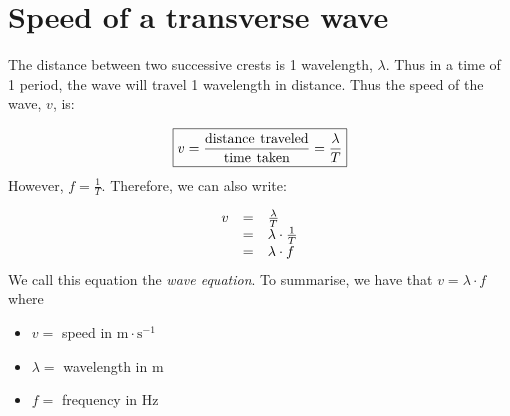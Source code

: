     \noindent
      \label{m38806*uid21}
            \section{Speed of a transverse wave}
            \nopagebreak
   
        \label{m38806*id319706}The distance between two successive crests is 1 wavelength, $\lambda $. Thus in a time of 1 period, the wave will travel 1 wavelength in distance. Thus the speed of the wave, $v$, is:\par 
        \label{m38806*id319732}\nopagebreak\noindent{}
    \begin{equation}\nonumber
    \boxed{v=\frac{\text{distance}\phantom{\rule{4.pt}{0ex}}\text{traveled}}{\text{time}\phantom{\rule{4.pt}{0ex}}\text{taken}}=\frac{\lambda }{T}}
      \end{equation}
        \label{m38806*id319776}However, $f=\frac{1}{T}$. Therefore, we can also write:\par 
        \label{m38806*id319802}\nopagebreak\noindent{}
          
    \begin{equation}\nonumber
    \begin{array}{ccc}\hfill v& =& \frac{\lambda }{T}\hfill \\ & =& \lambda \ensuremath{\cdot}\frac{1}{T}\hfill \\ & =& \lambda \ensuremath{\cdot}f\hfill \end{array}
      \end{equation}
        \label{m38806*id319870}We call this equation the \textsl{wave equation}. To summarise, we have that $v=\lambda \ensuremath{\cdot}f$ where\par 
        \label{m38806*id319901}\begin{itemize}[noitemsep]
            \label{m38806*uid22}\item $v=$ speed in $\text{m}\ensuremath{\cdot}\text{s}{}^{-1}$\label{m38806*uid23}\item $\lambda =$ wavelength in $\text{m}$
\label{m38806*uid24}\item $f=$ frequency in $\text{Hz}$
\end{itemize}



